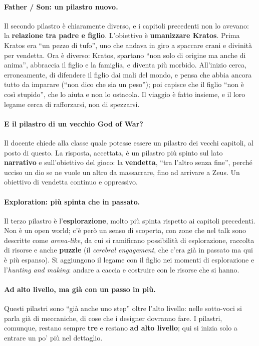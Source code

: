 \paragraph{Father / Son: un pilastro nuovo.} Il secondo pilastro è
chiaramente diverso, e i capitoli precedenti non lo avevano: la
\textbf{relazione tra padre e figlio}. L'obiettivo è \textbf{umanizzare
Kratos}. Prima Kratos era ``un pezzo di tufo'', uno che andava in giro a
spaccare crani e divinità per vendetta. Ora è diverso: Kratos, spartano ``non
solo di origine ma anche di anima'', abbraccia il figlio e la famiglia, e
diventa più morbido. All'inizio cerca, erroneamente, di difendere il figlio
dai mali del mondo, e pensa che abbia ancora tutto da imparare (``non dico
che sia un peso''); poi capisce che il figlio ``non è così stupido'', che lo
aiuta e non lo ostacola. Il viaggio è fatto insieme, e il loro legame cerca
di rafforzarsi, non di spezzarsi.

\paragraph{E il pilastro di un vecchio God of War?} Il docente chiede alla
classe quale potesse essere un pilastro dei vecchi capitoli, al posto di
questo. La risposta, accettata, è un pilastro più spinto sul lato
\textbf{narrativo} e sull'obiettivo del gioco: la \textbf{vendetta}, ``tra
l'altro senza fine'', perché ucciso un dio se ne vuole un altro da
massacrare, fino ad arrivare a Zeus. Un obiettivo di vendetta continuo e
oppressivo.

\paragraph{Exploration: più spinta che in passato.} Il terzo pilastro è
l'\textbf{esplorazione}, molto più spinta rispetto ai capitoli precedenti.
Non è un open world; c'è però un senso di scoperta, con zone che nel talk sono
descritte come \emph{arena-like}, da cui si ramificano possibilità di
esplorazione, raccolta di risorse e anche \textbf{puzzle} (il
\emph{cerebral engagement}, che c'era già in passato ma qui è più espanso).
Si aggiungono il legame con il figlio nei momenti di esplorazione e
l'\emph{hunting and making}: andare a caccia e costruire con le risorse che si
hanno.

\paragraph{Ad alto livello, ma già con un passo in più.} Questi pilastri sono
``già anche uno step'' oltre l'alto livello: nelle sotto-voci si parla già di
meccaniche, di cose che i designer dovranno fare. I pilastri, comunque,
restano sempre \textbf{tre} e restano \textbf{ad alto livello}; qui si inizia
solo a entrare un po' più nel dettaglio.

